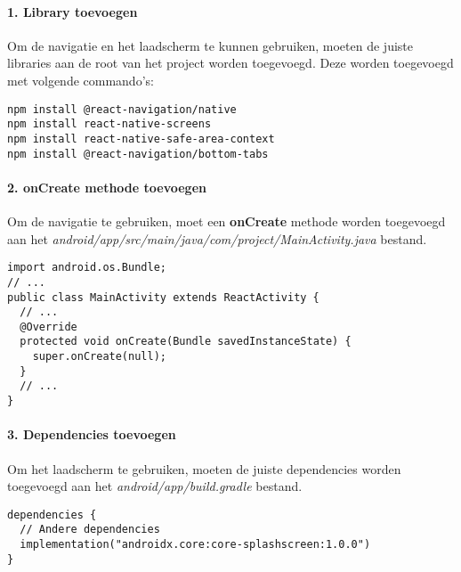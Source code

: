 \paragraph{1. Library toevoegen}
Om de navigatie en het laadscherm te kunnen gebruiken, moeten de juiste libraries aan 
de root van het project worden toegevoegd. Deze worden toegevoegd met volgende commando's:
\begin{verbatim}
npm install @react-navigation/native
npm install react-native-screens
npm install react-native-safe-area-context
npm install @react-navigation/bottom-tabs
\end{verbatim}

\paragraph{2. onCreate methode toevoegen}
Om de navigatie te gebruiken, moet een \textbf{onCreate} methode worden toegevoegd aan het
\textit{android/app/src/main/java/com/project/MainActivity.java} bestand.
\begin{verbatim}
import android.os.Bundle;
// ...
public class MainActivity extends ReactActivity {
  // ...
  @Override
  protected void onCreate(Bundle savedInstanceState) {
    super.onCreate(null);
  }
  // ...
}
\end{verbatim}

\paragraph{3. Dependencies toevoegen}
Om het laadscherm te gebruiken, moeten de juiste dependencies worden toegevoegd aan het
\textit{android/app/build.gradle} bestand.
\begin{verbatim}
dependencies {
  // Andere dependencies
  implementation("androidx.core:core-splashscreen:1.0.0")
}
\end{verbatim}

